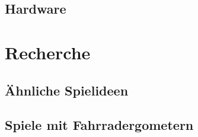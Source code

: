 
\section{Hardware}


 
\chapter{Recherche}
\section{Ähnliche Spielideen}


\section{Spiele mit Fahrradergometern}
\label{StateOfTheArt}












